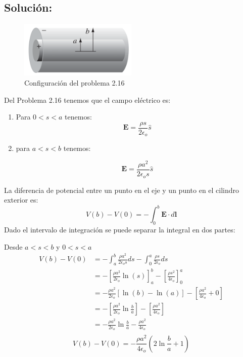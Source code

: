 \documentclass[12pt]{article}
\begin{document}
\subsection*{Solución:}

\begin{figure}[H]
    \centering
    \includegraphics[width=0.5\textwidth]{imagenes/problema_24.png}
    \caption*{\label{fig:problema_24}Configuración del problema 2.16}
\end{figure}


Del Problema 2.16 tenemos que el campo eléctrico es:
\begin{enumerate}[label=(\roman*)]
    \item Para \(0 < s < a\) tenemos:
        \[
        \mathbf{E} = \frac{\rho s}{2\epsilon_o }  \hat{s}
        \]
    \item  para \( a < s < b \) tenemos:
            
        \[
        \mathbf{E} = \frac{\rho a^2}{2\epsilon_o s }  \hat{s}
        \]
\end{enumerate} 

La diferencia de potencial entre un punto en el eje y un punto en el cilindro exterior es:
\[
{V(b)}-{V(0)}   = -\int_{0}^{b} \mathbf{E}\cdot d \mathbf{l}  
\]
Dado el intervalo de integración se puede separar la integral en dos partes:

Desde  \(a < s < b\) y  \(0 < s <a\)
\begin{align*}
    {V(b)}-{V(0)}   &= -\int_{a}^{b} \frac{\rho a^2}{2\epsilon_o s } ds - \int_{0}^{a} \frac{\rho s}{2\epsilon_o } ds \\
    &= -\left[\frac{\rho a^2}{2\epsilon_o} \ln(s) \right]_{a}^{b} - \left[\frac{\rho s^2}{4\epsilon_o} \right]_{0}^{a} \\
    &= -\frac{\rho a^2}{2\epsilon_o} \left[\ln(b) -\ln(a)  \right] - \left[\frac{\rho a^2}{4\epsilon_o} + 0 \right] \\
    &= -\left[\frac{\rho a^2}{2\epsilon_o} \ln{\frac{b}{a} } \right] - \left[\frac{\rho a^2}{4\epsilon_o} \right] \\
    &= -\frac{\rho a^2}{2\epsilon_o} \ln{\frac{b}{a} } - \frac{\rho a^2}{4\epsilon_o}\\
\end{align*}
\[
\boxed{V(b)-V(0) =-\frac{\rho a^2}{4\epsilon_o} \left(2\ln{\frac{b}{a} } + 1 \right) }
\]
\end{document}
